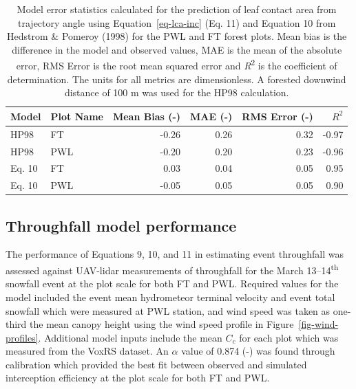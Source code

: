 \documentclass[
  letterpaper,
  DIV=11,
  numbers=noendperiod]{scrartcl}
\begin{document}
\begin{longtable}[]{@{}llrrrr@{}}

\caption{\label{tbl-lca-mod-err}Model error statistics calculated for
the prediction of leaf contact area from trajectory angle using
Equation~\ref{eq-lca-inc} (Eq. 11) and Equation 10 from Hedstrom \&
Pomeroy (1998) for the PWL and FT forest plots. Mean bias is the
difference in the model and observed values, MAE is the mean of the
absolute error, RMS Error is the root mean squared error and
\emph{R}\textsuperscript{2} is the coefficient of determination. The
units for all metrics are dimensionless. A forested downwind distance of
100 m was used for the HP98 calculation.}

\tabularnewline

\toprule\noalign{}
Model & Plot Name & Mean Bias (-) & MAE (-) & RMS Error (-) & \(R^2\) \\
\midrule\noalign{}
\endhead
\bottomrule\noalign{}
\endlastfoot
HP98 & FT & -0.26 & 0.26 & 0.32 & -0.97 \\
HP98 & PWL & -0.20 & 0.20 & 0.23 & -0.96 \\
Eq. 10 & FT & 0.03 & 0.04 & 0.05 & 0.95 \\
Eq. 10 & PWL & -0.05 & 0.05 & 0.05 & 0.90 \\

\end{longtable}

\subsection{Throughfall model
performance}\label{throughfall-model-performance}

The performance of Equations 9, 10, and 11 in estimating event
throughfall was assessed against UAV-lidar measurements of throughfall
for the March 13--14\textsuperscript{th} snowfall event at the plot
scale for both FT and PWL. Required values for the model included the
event mean hydrometeor terminal velocity and event total snowfall which
were measured at PWL station, and wind speed was taken as one-third the
mean canopy height using the wind speed profile in
Figure~\ref{fig-wind-profiles}. Additional model inputs include the mean
\(C_c\) for each plot which was measured from the VoxRS dataset. An
\(\alpha\) value of 0.874 (-) was found through calibration which
provided the best fit between observed and simulated interception
efficiency at the plot scale for both FT and PWL.
\end{document}

